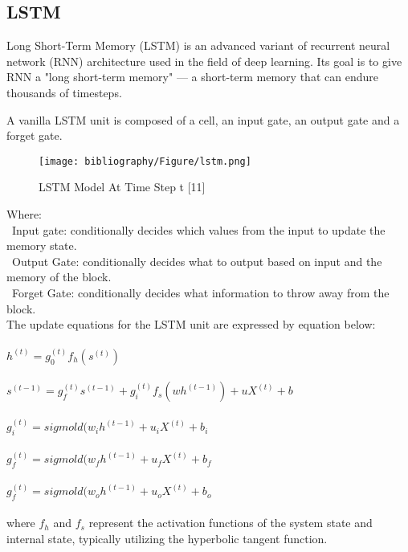 \documentclass{ieeeojies}
\begin{document}
\subsection{LSTM}
Long Short-Term Memory (LSTM) is an advanced variant of recurrent neural network (RNN) architecture used in the field of deep learning. Its goal is to give RNN a "long short-term memory" — a short-term memory that can endure thousands of timesteps.

A vanilla LSTM unit is composed of a cell, an input gate, an output gate and a forget gate.

\begin{figure}[H]
  \centering
  \begin{minipage}{0.8\linewidth}
    \centering
    \texttt{[image: bibliography/Figure/lstm.png]}
    \caption{LSTM Model At Time Step t [11]}
    \label{fig9}
  \end{minipage}
\end{figure}

Where:\\
\indent\textbullet\ Input gate: conditionally decides which values from the input to update the memory state.\\
\indent\textbullet\ Output Gate: conditionally decides what to output based on input and the memory of the block.\\
\indent\textbullet\ Forget Gate: conditionally decides what information to throw away from the block.\\

The update equations for the LSTM unit are expressed by equation below: \\
\\$h^{(t)} = g_0^{(t)}f_h(s^{(t)})$ \quad[11]\\
\\$s^{(t-1)} = g_f^{(t)}s^{(t-1)} + g_i^{(t)}f_s(wh^{(t-1)}) + uX^{(t)} + b$ \quad[11]\\
\\$g_i^{(t)} = sigmold (w_ih^{(t-1)} + u_iX^{(t)} + b_i$ \quad[11]\\
\\$g_f^{(t)} = sigmold (w_fh^{(t-1)} + u_fX^{(t)} + b_f$ \quad[11]\\
\\$g_f^{(t)} = sigmold (w_oh^{(t-1)} + u_oX^{(t)} + b_o$ \quad[11]\\
\\ where $f_h$ and $f_s$
represent the activation functions of the 
system state and internal state, typically utilizing the 
hyperbolic tangent function.
\end{document}
